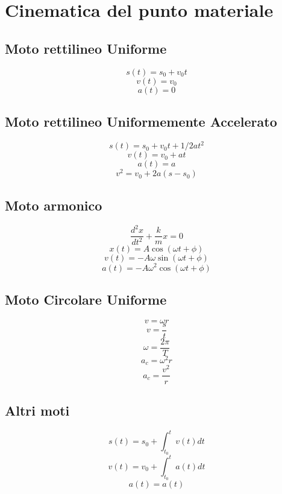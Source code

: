 \documentclass[../../dimostrazioni]{subfiles}
\begin{document}
    \chapter{Cinematica del punto materiale}

        \section*{Moto rettilineo Uniforme}
        
            \[    s(t) = s_0 + v_0 t   \]
            \[    v(t) = v_0     \]
            \[    a(t) = 0     \]   
        
        \section*{Moto rettilineo Uniformemente Accelerato}
        
            \[    s(t) = s_0 + v_0 t + 1/2 a t^2   \]
            \[    v(t) = v_0 + a t     \]
            \[    a(t) = a     \]
            \[    v^2 = v_0 + 2a(s - s_0)   \]
        
        \section*{Moto armonico}
        
            \[    \frac{d^2x}{dt^2} + \frac{k}{m}x = 0   \]
            \[    x(t) = A \cos(\omega t + \phi)     \]
            \[    v(t) = -A \omega \sin(\omega t + \phi)     \]
            \[    a(t) = -A \omega^2 \cos(\omega t + \phi)   \]
        
        \section*{Moto Circolare Uniforme}
        
            \[    v = \omega r   \] %
            \[    v = \frac{s}{t}    \] %
            \[    \omega = \frac{2\pi}{T}      \]
            \[    a_c = \omega^2 r   \]
            \[    a_c = \frac{v^2}{r}   \]
        
        \section*{Altri moti}
        
            \[    s(t) = s_0 + \int_{t_0}^{t} v(t) dt  \]
            \[    v(t) = v_0 + \int_{t_0}^{t} a(t) dt     \]
            \[    a(t) = a (t)     \]
        

        
\end{document}
